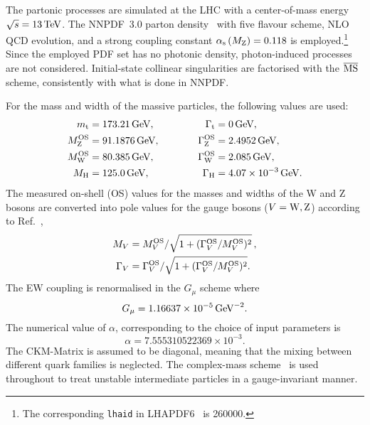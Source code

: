 The partonic processes are simulated at the LHC with a center-of-mass energy $\sqrt s = 13 \,\text{TeV}$.
The NNPDF~3.0 parton density~\cite{Ball:2014uwa} with five flavour scheme, NLO QCD evolution, and a strong coupling constant $\alpha_\text{s}\left( M_\text{Z} \right) = 0.118$ is employed.\footnote{The corresponding {\tt lhaid} in LHAPDF6~\cite{Buckley:2014ana} is 260000.}
Since the employed PDF set has no photonic density, photon-induced processes are not considered.
Initial-state collinear singularities are factorised with the ${\overline{\rm MS}}$ scheme, consistently with what is done in NNPDF.

For the mass and width of the massive particles, the following values are used:
%
\begin{alignat}{2}
                  m_\text{t}   &=  173.21\,\text{GeV},       & \quad \quad \quad \Gamma_\text{t} &= 0 \,\text{GeV},  \nonumber \\
                M_\text{Z}^\text{OS} &=  91.1876\,\text{GeV},      & \quad \quad \quad \Gamma_\text{Z}^\text{OS} &= 2.4952\,\text{GeV},  \nonumber \\
                M_\text{W}^\text{OS} &=  80.385\,\text{GeV},       & \Gamma_\text{W}^\text{OS} &= 2.085\,\text{GeV},  \nonumber \\
                M_{\rm H} &=  125.0\,\text{GeV},       &  \Gamma_\text{H}   &=  4.07 \times 10^{-3}\,\text{GeV}.
\end{alignat}
%
The measured on-shell (OS) values for the masses and widths of the W and Z bosons are converted into pole values for the gauge bosons ($V=\text{W},\text{Z}$) according to Ref.~\cite{Bardin:1988xt},
%
\begin{equation}
\begin{split}
        M_V &= M_{V}^\text{OS}/\sqrt{1+(\Gamma_{V}^\text{OS}/M_{V}^\text{OS})^2}\,, \\
   \Gamma_V &= \Gamma_{V}^\text{OS}/\sqrt{1+(\Gamma_{V}^\text{OS}/M_{V}^\text{OS})^2}.
\end{split}
\end{equation}
%
The EW coupling is renormalised in the $G_\mu$ scheme \cite{Denner:2000bj} where
%
\begin{equation}
    G_{\mu}    = 1.16637\times 10^{-5}\,\text{GeV}^{-2}.
\end{equation}
%
The numerical value of $\alpha$, corresponding to the choice of input parameters is
%
\begin{equation}
 \alpha = 7.555310522369 \times 10^{-3}.
\end{equation}
The CKM-Matrix is assumed to be diagonal, meaning that the mixing between different quark families is neglected.
The complex-mass scheme~\cite{Denner:1999gp,Denner:2005fg} is used throughout to treat unstable intermediate particles in a gauge-invariant manner.

